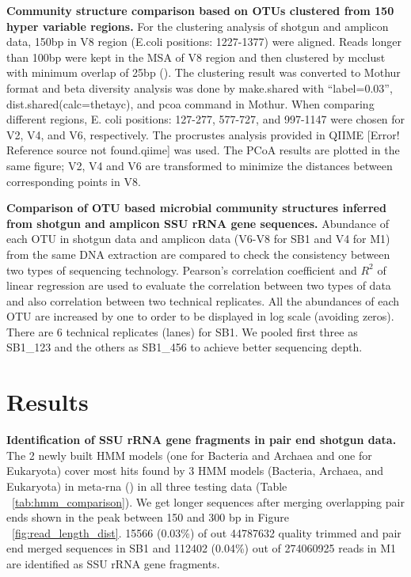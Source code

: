 \documentclass[12pt]{article}
\begin{document}
  {\bf Community structure comparison based on OTUs clustered from 150 hyper variable regions. }
  For the clustering analysis of shotgun and amplicon data, 150bp in V8 region (E.coli positions: 1227-1377) were aligned. Reads longer than 100bp were kept in the MSA of V8 region and then clustered by mcclust with minimum overlap of 25bp (\cite{rdp2009}). The clustering result was converted to Mothur format and beta diversity analysis was done by make.shared with ``label=0.03'', dist.shared(calc=thetayc), and pcoa command in Mothur. When comparing different regions, E. coli positions: 127-277, 577-727, and 997-1147 were chosen for V2, V4, and V6, respectively. The procrustes analysis provided in QIIME [Error! Reference source not found.qiime] was used. The PCoA results are plotted in the same figure; V2, V4 and V6 are transformed to minimize the distances between corresponding points in V8.

  {\bf Comparison of OTU based microbial community structures inferred from shotgun and amplicon SSU rRNA gene sequences. }
Abundance of each OTU in shotgun data and amplicon data (V6-V8 for SB1 and V4 for M1) from the same DNA extraction are compared to check the consistency between two types of sequencing technology. Pearson’s correlation coefficient and $R^2$ of linear regression are used to evaluate the correlation between two types of data and also correlation between two technical replicates. All the abundances of each OTU are increased by one to order to be displayed in log scale (avoiding zeros). There are 6 technical replicates (lanes) for SB1. We pooled first three as SB1\_123 and the others as SB1\_456 to achieve better sequencing depth.

\section{Results}

  {\bf Identification of SSU rRNA gene fragments in pair end shotgun data. }
  The 2 newly built HMM models (one for Bacteria and Archaea and one for Eukaryota) cover most hits found by 3 HMM models (Bacteria, Archaea, and Eukaryota) in meta-rna (\cite{metarna}) in all three testing data (Table ~\ref{tab:hmm_comparison}). We get longer sequences after merging overlapping pair ends shown in the peak between 150 and 300 bp in Figure ~\ref{fig:read_length_dist}. 15566 (0.03\%) of out 44787632 quality trimmed and pair end merged sequences in SB1 and 112402 (0.04\%) out of 274060925 reads in M1 are identified as SSU rRNA gene fragments. 
\end{document}
